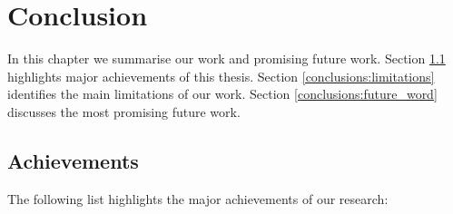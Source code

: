 \chapter{Conclusion} \label{chapt:Conclusion}

In this chapter we summarise our work and promising future work. Section \ref{conclusion:achievements} highlights major achievements of this thesis. Section \ref{conclusions:limitations} identifies the main limitations of our work. Section \ref{conclusions:future_word} discusses the most promising future work.


\section{Achievements} \label{conclusion:achievements}

The following list highlights the major achievements of our research:

